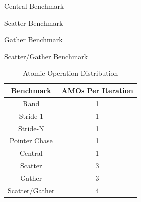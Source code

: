 \begin{algorithm}
\SetAlgoLined
{}
\caption{Central Benchmark}
\label{alg:central}
\end{algorithm}

\begin{algorithm}
\SetAlgoLined
{}
\caption{Scatter Benchmark}
\label{alg:scatter}
\end{algorithm}

\begin{algorithm}
\SetAlgoLined
{}
\caption{Gather Benchmark}
\label{alg:gather}
\end{algorithm}

\begin{algorithm}
\SetAlgoLined
{}
\caption{Scatter/Gather Benchmark}
\label{alg:sg}
\end{algorithm}

\begin{table}
  \caption{Atomic Operation Distribution}
  \label{tab:amodistro}
  \begin{tabular}{cc}
    \toprule
    Benchmark&AMOs Per Iteration\\
    \midrule
   Rand & 1\\
   Stride-1 & 1\\
   Stride-N & 1\\
   Pointer Chase & 1\\
   Central & 1\\
   Scatter & 3\\
   Gather & 3\\
   Scatter/Gather & 4\\
  \bottomrule
\end{tabular}
\end{table}